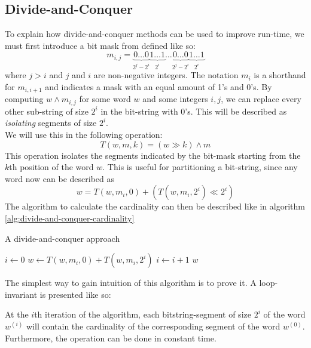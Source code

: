 \subsection{Divide-and-Conquer}
To explain how divide-and-conquer methods can be used to improve run-time, we must first introduce a bit mask from \cite{fast-similarity-search} defined like so:
$$m_{i,j} = \underbrace{0\dots 0}_{2^{j}-2^{i}}\underbrace{1\dots 1}_{2^i}\dots\underbrace{0\dots 0}_{2^{j}-2^{i}}\underbrace{1\dots 1}_{2^i}$$
where $j > i$ and $j$ and $i$ are non-negative integers. The notation $m_{i}$ is a shorthand for $m_{i, i+1}$ and indicates a mask with an equal amount of 1's and 0's. By computing $w \land m_{i,j}$ for some word $w$ and some integers $i, j$, we can replace every other sub-string of size $2^i$ in the bit-string with 0's. This will be described as \textit{isolating} segments of size $2^i$.\\
We will use this in the following operation:
\begin{equation}
    T(w, m, k) = (w\gg k) \land m
\end{equation}
This operation isolates the segments indicated by the bit-mask starting from the $k$th position of the word $w$. This is useful for partitioning a bit-string, since any word now can be described as
$$w=T(w, m_i, 0) + (T(w, m_i, 2^i) \ll 2^i)$$
The algorithm to calculate the cardinality can then be described like in algorithm \ref{alg:divide-and-conquer-cardinality}
\begin{algorithm}[H]
\caption{A divide-and-conquer approach}\label{alg:divide-and-conquer-cardinality}
\begin{algorithmic}[1]
 
\State $i \gets 0$
\State $w \gets T(w, m_i, 0) + T(w, m_i, 2^i)$
\State $i \gets i + 1$
\EndWhile
\State \Return $w$
\EndFunction
\end{algorithmic}
\end{algorithm}
The simplest way to gain intuition of this algorithm is to prove it. A loop-invariant is presented like so:
\begin{invariant}
\label{thm:divide-invariant}
At the $i$th iteration of the algorithm, each bitstring-segment of size $2^i$ of the word $w^{(i)}$ will contain the cardinality of the corresponding segment of the word $w^{(0)}$. Furthermore, the operation can be done in constant time.
\end{invariant}
